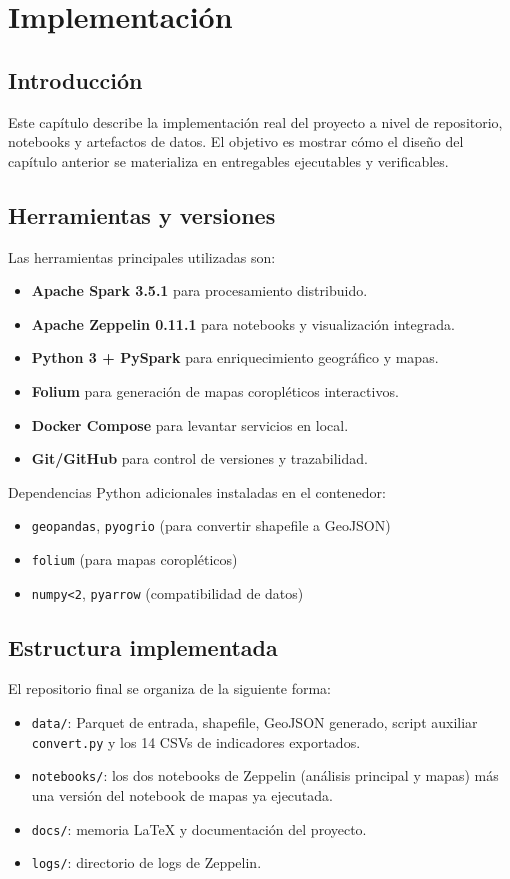 \chapter{Implementación}\label{cap:implementacion}

\section{Introducción}
Este capítulo describe la implementación real del proyecto a nivel de repositorio,
notebooks y artefactos de datos. El objetivo es mostrar cómo el diseño del
capítulo anterior se materializa en entregables ejecutables y verificables.

\section{Herramientas y versiones}
Las herramientas principales utilizadas son:
\begin{itemize}
	\item \textbf{Apache Spark 3.5.1} para procesamiento distribuido.
	\item \textbf{Apache Zeppelin 0.11.1} para notebooks y visualización integrada.
	\item \textbf{Python 3 + PySpark} para enriquecimiento geográfico y mapas.
	\item \textbf{Folium} para generación de mapas coropléticos interactivos.
	\item \textbf{Docker Compose} para levantar servicios en local.
	\item \textbf{Git/GitHub} para control de versiones y trazabilidad.
\end{itemize}

Dependencias Python adicionales instaladas en el contenedor:
\begin{itemize}
	\item \texttt{geopandas}, \texttt{pyogrio} (para convertir shapefile a GeoJSON)
	\item \texttt{folium} (para mapas coropléticos)
	\item \texttt{numpy<2}, \texttt{pyarrow} (compatibilidad de datos)
\end{itemize}

\section{Estructura implementada}
El repositorio final se organiza de la siguiente forma:
\begin{itemize}
	\item \texttt{data/}: Parquet de entrada, shapefile, GeoJSON generado,
	script auxiliar \texttt{convert.py} y los 14 CSVs de indicadores exportados.
	\item \texttt{notebooks/}: los dos notebooks de Zeppelin (análisis principal
	y mapas) más una versión del notebook de mapas ya ejecutada.
	\item \texttt{docs/}: memoria LaTeX y documentación del proyecto.
	\item \texttt{logs/}: directorio de logs de Zeppelin.
\end{itemize}

